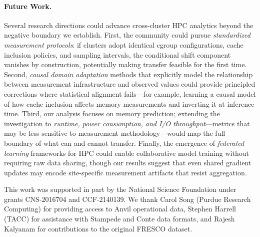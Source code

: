 \documentclass[sigconf]{acmart}
\begin{document}
\paragraph{Future Work.}
Several research directions could advance cross-cluster HPC analytics beyond the negative boundary we establish.
First, the community could pursue \emph{standardized measurement protocols}: if clusters adopt identical cgroup configurations, cache inclusion policies, and sampling intervals, the conditional shift component vanishes by construction, potentially making transfer feasible for the first time.
Second, \emph{causal domain adaptation} methods that explicitly model the relationship between measurement infrastructure and observed values could provide principled corrections where statistical alignment fails---for example, learning a causal model of how cache inclusion affects memory measurements and inverting it at inference time.
Third, our analysis focuses on memory prediction; extending the investigation to \emph{runtime, power consumption, and I/O throughput}---metrics that may be less sensitive to measurement methodology---would map the full boundary of what can and cannot transfer.
Finally, the emergence of \emph{federated learning} frameworks for HPC could enable collaborative model training without requiring raw data sharing, though our results suggest that even shared gradient updates may encode site-specific measurement artifacts that resist aggregation.


\begin{acks}
This work was supported in part by the National Science Foundation under grants CNS-2016704 and CCF-2140139.
We thank Carol Song (Purdue Research Computing) for providing access to Anvil operational data, Stephen Harrell (TACC) for assistance with Stampede and Conte data formats, and Rajesh Kalyanam for contributions to the original FRESCO dataset.
\end{acks}




\end{document}
